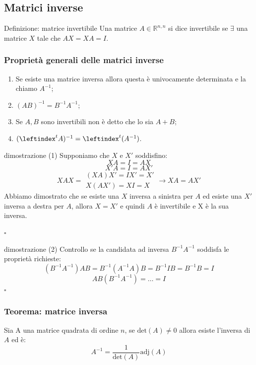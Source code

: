 \documentclass[x11names]{article}
\newcommand*{\QEDB}{\null\nobreak\hfill\ensuremath{\square}}%
\begin{document}
\subsection{Matrici inverse}
\begin{center}
\colorbox{myblue}{\begin{minipage}{5.75in}
\begin{blues}{Definizione: matrice invertibile}
    Una matrice $A \in \mathbb{R}^{n,n}$ si dice invertibile se $\exists$ una matrice $X$ tale che $AX = XA = I$.
\end{blues}
\end{minipage}}        
\end{center}
\subsubsection*{Proprietà generali delle matrici inverse}
\begin{enumerate}
    \item Se esiste una matrice inversa allora questa è univocamente determinata e la chiamo $A^{-1}$;
    \item $(AB)^{-1} = B^{-1}A^{-1}$;
    \item Se $A,B$ sono invertibili non è detto che lo sia $A+B$;
    \item $(\leftindex ^t{A})^{-1} = \leftindex ^t(A^{-1})$.
\end{enumerate}



\begin{es}{dimostrazione (1)}
Supponiamo che $X$ e $X'$ soddisfino:
$$
XA = I = AX 
$$
$$
X' A = I = AX'
$$
$$
XAX = \begin{array}{c}
       (XA)X' = IX' = X' \\
       X(AX') = XI = X
    \end{array}
    \rightarrow
    XA = AX'
$$
Abbiamo dimostrato che se esiste una $X$ inversa a sinistra per $A$ ed esiste una $X' $ inversa a destra per $A$, allora $X=X'$ e quindi $A$ è invertibile e X è la sua inversa. 

\QEDB
\end{es}
\begin{es}{dimostrazione (2)}
Controllo se la candidata ad inversa $B^{-1}A^{-1}$ soddisfa le proprietà richieste:
$$
(B^{-1}A^{-1})AB = B^{-1}(A^{-1}A)B = B^{-1}IB = B^{-1}B = I
$$
$$
AB(B^{-1}A^{-1})= \dots = I
$$
\QEDB
\end{es}

\begin{center}
	\colorbox{myred}{\begin{minipage}{5.75in}
			\begin{redes}{}
				\subsubsection{Teorema: matrice inversa}
			Sia A una matrice quadrata di ordine $n$, se $\text{det}(A) \neq 0$ allora esiste l’inversa di $A$ ed è:
			\[
			A^{-1} = \frac{1}{\text{det}(A)}\text{adj}(A)
			\]	
			\end{redes}
	\end{minipage}}        
\end{center}
\end{document}
